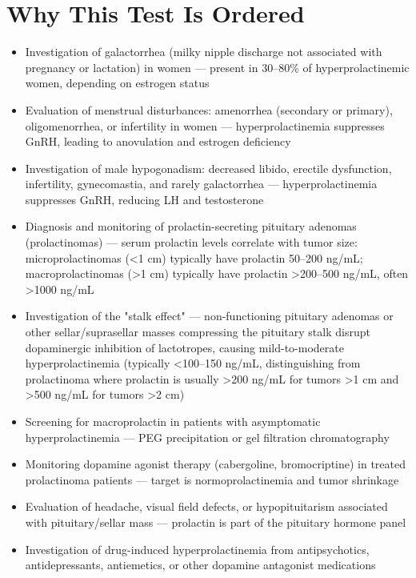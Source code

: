 \section*{Why This Test Is Ordered}
\begin{itemize}
  \item Investigation of galactorrhea (milky nipple discharge not associated with pregnancy or lactation) in women --- present in 30--80\% of hyperprolactinemic women, depending on estrogen status
  \item Evaluation of menstrual disturbances: amenorrhea (secondary or primary), oligomenorrhea, or infertility in women --- hyperprolactinemia suppresses GnRH, leading to anovulation and estrogen deficiency
  \item Investigation of male hypogonadism: decreased libido, erectile dysfunction, infertility, gynecomastia, and rarely galactorrhea --- hyperprolactinemia suppresses GnRH, reducing LH and testosterone
  \item Diagnosis and monitoring of prolactin-secreting pituitary adenomas (prolactinomas) --- serum prolactin levels correlate with tumor size: microprolactinomas (<1 cm) typically have prolactin 50--200 ng/mL; macroprolactinomas (>1 cm) typically have prolactin >200--500 ng/mL, often >1000 ng/mL
  \item Investigation of the "stalk effect" --- non-functioning pituitary adenomas or other sellar/suprasellar masses compressing the pituitary stalk disrupt dopaminergic inhibition of lactotropes, causing mild-to-moderate hyperprolactinemia (typically <100--150 ng/mL, distinguishing from prolactinoma where prolactin is usually >200 ng/mL for tumors >1 cm and >500 ng/mL for tumors >2 cm)
  \item Screening for macroprolactin in patients with asymptomatic hyperprolactinemia --- PEG precipitation or gel filtration chromatography \cite{gibney2005impact}
  \item Monitoring dopamine agonist therapy (cabergoline, bromocriptine) in treated prolactinoma patients --- target is normoprolactinemia and tumor shrinkage
  \item Evaluation of headache, visual field defects, or hypopituitarism associated with pituitary/sellar mass --- prolactin is part of the pituitary hormone panel
  \item Investigation of drug-induced hyperprolactinemia from antipsychotics, antidepressants, antiemetics, or other dopamine antagonist medications
\end{itemize}

